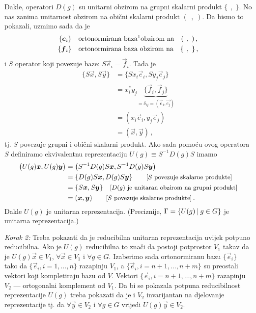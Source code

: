 Dakle, operatori $D(g)$ su unitarni obzirom na grupni skalarni produkt
$\{\;\,,\;\}$. No nas zanima unitarnost obzirom na obični
skalarni produkt $(\;\,,\;)$.
Da bismo to pokazali, uzmimo sada da je
\begin{align*}
\{\vec{e}_i\} \quad &\text{ortonormirana baza\footnotemark obzirom na} \quad (\;\,,\;) \,, \\
\{\vec{f}_i\} \quad &\text{ortonormirana baza obzirom na} \quad \{\;\,,\;\} \,,
\end{align*}
i $S$ operator koji povezuje baze: $S\vec{e}_i = \vec{f}_i$. Tada je
\begin{equation*}
\begin{split}
\{ S \vec{x}, S \vec{y}\} &= \{ S x_i \vec{e}_i, S y_j \vec{e}_j \} \\
&= x_{i}^* y_{j}\underbrace{ \{\vec{f}_i, \vec{f}_j\}}_{=\delta_{ij} =
 (\vec{e}_i, \vec{e_j})} \\
&= (x_i \vec{e}_i, y_j \vec{e}_j) \\
&= (\vec{x}, \vec{y}) \,,
\end{split}
\end{equation*}
tj. $S$ povezuje grupni i obični skalarni produkt. Ako sada pomoću
ovog operatora $S$ definiramo
ekvivalentnu reprezentaciju $U(g)\equiv S^{-1}D(g)S$ imamo
\begin{equation*}
\begin{split}
\big( U(g)\vec{x}, U(g)\vec{y}\big) &=
\big( S^{-1}D(g)S \vec{x}, S^{-1}D(g)S \vec{y}\big) \\
&= \{ D(g) S \vec{x}, D(g) S \vec{y} \} 
 \qquad \text{\small[$S$ povezuje skalarne produkte]}\\
&= \{ S \vec{x}, S \vec{y} \} \quad
\text{\small[$D(g)$ je unitaran obzirom na grupni produkt]}\\
&= (\vec{x}, \vec{y}) \qquad \text{\small[$S$ povezuje skalarne produkte]} \,.
\end{split}
\end{equation*}
Dakle $U(g)$ je unitarna reprezentacija. (Preciznije, $\Gamma = \{U(g) \: | \: g\in G\}$
je unitarna reprezentacija.)

\emph{Korak 2:} Treba pokazati da je reducibilna unitarna reprezentacija
uvijek potpuno reducibilna. Ako je $U(g)$ reducibilna to znači da postoji
potprostor $V_1$ takav da je  $U(g) \vec{x} \in V_1$,
$\forall\vec{x} \in V_1$ i $\forall g\in G$.
Izaberimo sada ortonormiranu bazu $\{\vec{e}_i\}$ tako da 
$\{\vec{e}_i, i=1,\ldots, n\}$ razapinju $V_1$, a
$\{\vec{e}_i, i=n+1,\ldots, n+m \}$ su preostali vektori koji kompletiraju
bazu od $V$. Vektori $\{\vec{e}_i, i=n+1,\ldots, n+m \}$ razapinju $V_2$ ---
ortogonalni komplement od $V_1$. 
Da bi se pokazala potpuna reducibilnost
reprezentacije $U(g)$ treba pokazati da  je i $V_2$ invarijantan na djelovanje
reprezentacije tj. da 
$\forall\vec{y} \in V_2$ i $\forall g \in G$ vrijedi $U(g) \vec{y} \in V_2$.


